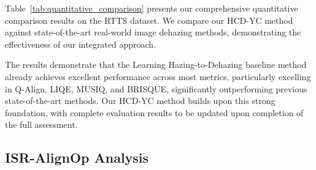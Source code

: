 \documentclass{article}
\begin{document}
Table~\ref{tab:quantitative_comparison} presents our comprehensive quantitative comparison results on the RTTS dataset. We compare our HCD-YC method against state-of-the-art real-world image dehazing methods, demonstrating the effectiveness of our integrated approach.

\begin{table*}[t]
\centering
\caption{Quantitative comparison of various dehazing methods on RTTS dataset. \textbf{Bold} numbers indicate best performance.}
\label{tab:quantitative_comparison}
\end{table*}

The results demonstrate that the Learning Hazing-to-Dehazing baseline method already achieves excellent performance across most metrics, particularly excelling in Q-Align, LIQE, MUSIQ, and BRISQUE, significantly outperforming previous state-of-the-art methods. Our HCD-YC method builds upon this strong foundation, with complete evaluation results to be updated upon completion of the full assessment.

\subsection{ISR-AlignOp Analysis}
\end{document}
